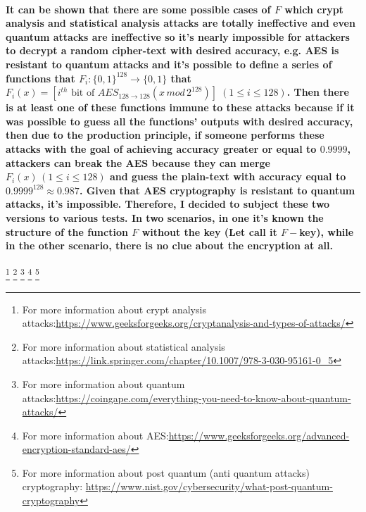 \documentclass[oneside]{book}
\newcommand{\myparagraph}[1]{\paragraph{\textnormal{#1}}}
\begin{document}
\myparagraph{
It can be shown that there are some possible cases of $F$ which crypt analysis and statistical analysis attacks are totally ineffective and even quantum attacks are ineffective so it's nearly impossible for attackers to decrypt a random cipher-text with desired accuracy, e.g. AES is resistant to quantum attacks and it's possible to define a series of functions that $F_i : \{0, 1\}^{128} \rightarrow \{0, 1\} $ that $F_i(x) = [i^{th} \text{ bit of } AES_{128 \rightarrow 128}(x \, mod \, 2^{128})] \; (1 \le i \le 128)$. Then there is at least one of these functions immune to these attacks because if it was possible to guess all the functions' outputs with desired accuracy, then due to the production principle, if someone performs these attacks with the goal of achieving accuracy greater or equal to $0.9999$, attackers can break the AES because they can merge $F_i(x) \, (1 \le i \le 128)$ and guess the plain-text with accuracy equal to $0.9999^{128} \approx 0.987$. Given that AES cryptography is resistant to quantum attacks, it's impossible. Therefore, I decided to subject these two versions to various tests. In two scenarios, in one it's known the structure of the function $F$ without the key (Let call it $F-$key), while in the other scenario, there is no clue about the encryption at all.
}
\footnote{For more information about crypt analysis attacks:\newline \href{https://www.geeksforgeeks.org/cryptanalysis-and-types-of-attacks/}{https://www.geeksforgeeks.org/cryptanalysis-and-types-of-attacks/}}
\footnote{For more information about statistical analysis attacks:\newline \href{https://link.springer.com/chapter/10.1007/978-3-030-95161-0_5}{https://link.springer.com/chapter/10.1007/978-3-030-95161-0\_5}}
\footnote{For more information about quantum attacks:\newline \href{https://coingape.com/everything-you-need-to-know-about-quantum-attacks/}{https://coingape.com/everything-you-need-to-know-about-quantum-attacks/}}
\footnote{For more information about AES:\newline \href{https://www.geeksforgeeks.org/advanced-encryption-standard-aes/}{https://www.geeksforgeeks.org/advanced-encryption-standard-aes/}}
\footnote{For more information about post quantum (anti quantum attacks) cryptography: \newline \href{https://www.nist.gov/cybersecurity/what-post-quantum-cryptography}{https://www.nist.gov/cybersecurity/what-post-quantum-cryptography}}
\end{document}
